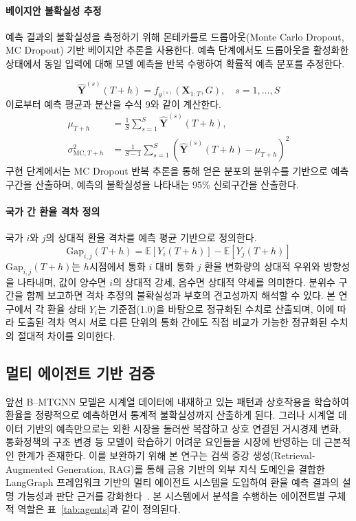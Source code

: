\paragraph{베이지안 불확실성 추정}
예측 결과의 불확실성을 측정하기 위해 몬테카를로 드롭아웃(Monte Carlo Dropout, MC Dropout) 기반 베이지안 추론을 사용한다. 예측 단계에서도 드롭아웃을 활성화한 상태에서 동일 입력에 대해 모델 예측을 반복 수행하여 확률적 예측 분포를 추정한다.

\begin{equation}
\hat{\mathbf{Y}}^{(s)}(T+h)=f_{\theta^{(s)}}\!\left(\mathbf{X}_{1:T},G\right),\quad s=1,\dots,S
\tag{8}
\end{equation}
이로부터 예측 평균과 분산을 수식 9와 같이 계산한다. %
\begin{equation}
\begin{aligned}
\mu_{T+h} &= \frac{1}{S}\sum_{s=1}^{S}\hat{\mathbf{Y}}^{(s)}(T+h),\\
\sigma^2_{\mathrm{MC},T+h} &= \frac{1}{S-1}\sum_{s=1}^{S}\left(\hat{\mathbf{Y}}^{(s)}(T+h)-\mu_{T+h}\right)^2
\end{aligned}
\tag{9}
\end{equation}
구현 단계에서는 MC Dropout 반복 추론을 통해 얻은 분포의 분위수를 기반으로 예측구간을 산출하며, 예측의 불확실성을 나타내는 95\% 신뢰구간을 산출한다.

\paragraph{국가 간 환율 격차 정의}
국가 $i$와 $j$의 상대적 환율 격차를 예측 평균 기반으로 정의한다.
\begin{equation}
\mathrm{Gap}_{i,j}(T+h)=\mathbb{E}\!\left[Y_i(T+h)\right]-\mathbb{E}\!\left[Y_j(T+h)\right]
\tag{10}
\end{equation}
$\mathrm{Gap}_{i,j}(T+h)$는 $h$시점에서 통화 $i$ 대비 통화 $j$ 환율 변화량의 상대적 우위와 방향성을 나타내며, 값이 양수면 $i$의 상대적 강세, 음수면 상대적 약세를 의미한다. 분위수 구간을 함께 보고하면 격차 추정의 불확실성과 부호의 견고성까지 해석할 수 있다.
본 연구에서 각 환율 상태 $Y_i$는 기준점(1.0)을 바탕으로 정규화된 수치로 산출되며, 이에 따라 도출된 격차 역시 서로 다른 단위의 통화 간에도 직접 비교가 가능한 정규화된 수치의 절대적 차이를 의미한다.

\subsection{멀티 에이전트 기반 검증}
앞선 B--MTGNN 모델은 시계열 데이터에 내재하고 있는 패턴과 상호작용을 학습하여 환율을 정량적으로 예측하면서 통계적 불확실성까지 산출하게 된다. 그러나 시계열 데이터 기반의 예측만으로는 외환 시장을 둘러싼 복잡하고 상호 연결된 거시경제 변화, 통화정책의 구조 변경 등 모델이 학습하기 어려운 요인들을 시장에 반영하는 데 근본적인 한계가 존재한다. 이를 보완하기 위해 본 연구는 검색 증강 생성(Retrieval-Augmented Generation, RAG)를 통해 금융 기반의 외부 지식 도메인을 결합한 LangGraph 프레임워크 기반의 멀티 에이전트 시스템을 도입하여 환율 예측 결과의 설명 가능성과 판단 근거를 강화한다~\cite{Isufaj2025,Yu2023Temporal}. 본 시스템에서 분석을 수행하는 에이전트별 구체적 역할은 표~\ref{tab:agents}과 같이 정의된다.


